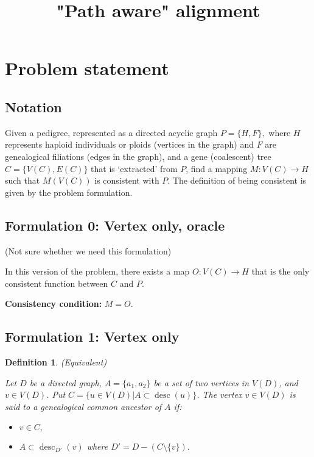 \documentclass[14pt]{extarticle}
\DeclareMathOperator{\desc}{desc}
\newtheorem{definition}{Definition}
\begin{document}
	
	
\title{"Path aware" alignment}
\date{}


\section{Problem statement}

\subsection{Notation}

Given a pedigree, represented as a directed acyclic graph $P = \{H, F\},$ where $H$ represents haploid individuals or ploids (vertices in the graph) and $F$ are genealogical filiations (edges in the graph), and a gene (coalescent) tree $C = \{V(C), E(C)\}$ that is `extracted' from $P$, find a mapping $M: V(C) \rightarrow H$ such that $M(V(C))$ is consistent with $P$. The definition of being consistent is given by the problem formulation.


\subsection{Formulation 0: Vertex only, oracle} (Not sure whether we need this formulation)

In this version of the problem, there exists a map $O: V(C) \rightarrow H$ that is the only consistent function between $C$ and $P$.

\textbf{Consistency condition:}  $M = O$.

\subsection{Formulation 1: Vertex only} 

\begin{definition} (Equivalent)
	
	Let $D$ be a directed graph, $A = \{a_1,  a_2\}$ be a set of two vertices in $V(D)$, and $v \in V(D)$. Put $C = \{u \in V(D) | A \subset \desc(u) \}$. The vertex $v \in V(D)$ is said to a genealogical common ancestor of $A$ if:
	
	\begin{itemize}
		\item 
		$v \in C,$
		\item 
		$A \subset \desc_{D'}(v)$ where $D' = D -  (C \setminus \{v\}).$
	\end{itemize}
	
\end{definition}
\end{document}
